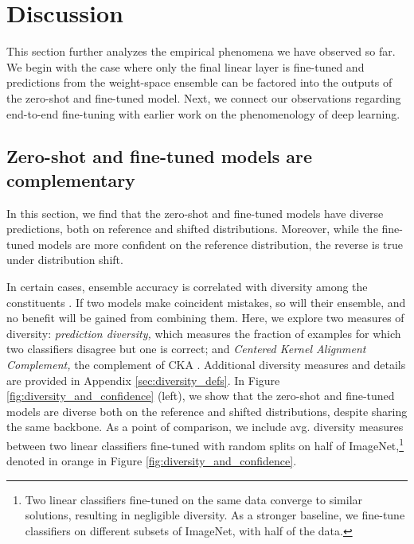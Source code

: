 \vspace*{-0.1cm}
\beforesec
\section{Discussion}
\label{sec:discussion}
\postsec
This section further analyzes the empirical phenomena we have observed so far.
We begin with the case where only the final linear layer is fine-tuned and predictions from the weight-space ensemble can be factored into the outputs of the zero-shot and fine-tuned model.
Next, we connect our observations regarding end-to-end fine-tuning with earlier work on the phenomenology of deep learning.%
\vspace*{-0.1cm}
\beforesec
\subsection{Zero-shot and fine-tuned models are complementary}
\label{sec:decomposing}
\postsec


In this section, we find that the zero-shot and fine-tuned models have diverse predictions, both on reference and shifted distributions. Moreover, while the fine-tuned models are more confident on the reference distribution, the reverse is true under distribution shift.  

\label{sec:diversity}
In certain cases, ensemble accuracy is correlated with diversity among the constituents \cite{kuncheva2003measures, gontijo2021no}.
If two models make coincident mistakes, so will their ensemble, and no benefit will be gained from combining them. 
Here, we explore two measures of diversity: {\it prediction diversity,} which measures the fraction of examples for which two classifiers disagree but one is correct; and {\it Centered Kernel Alignment Complement,}  the complement of CKA \cite{kornblith2019similarity}. 
Additional diversity measures and details are provided in Appendix \ref{sec:diversity_defs}.
In Figure \ref{fig:diversity_and_confidence} (left), we show that the zero-shot and fine-tuned models are diverse both on the reference and shifted distributions, despite sharing the same backbone. 
As a point of comparison, we include avg. diversity measures between two linear classifiers fine-tuned with random splits on half of 
ImageNet,\footnote{Two linear classifiers fine-tuned on the same data converge to similar solutions, resulting in negligible diversity. 
As a stronger baseline, we fine-tune classifiers on different subsets of ImageNet, with half of the data.} denoted in orange in Figure \ref{fig:diversity_and_confidence}.


